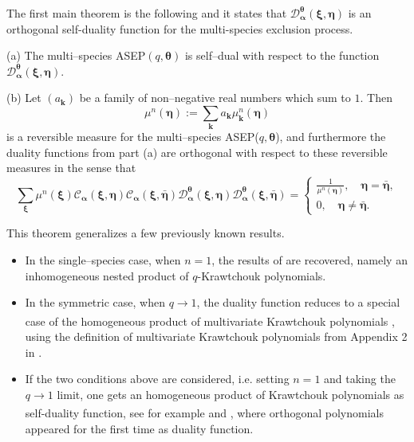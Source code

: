 \documentclass{ximera}
\begin{document}
The first main theorem is the following and it states that $\mathcal{D}_{\boldsymbol{\alpha}}^{\boldsymbol\theta} (\boldsymbol\xi,\boldsymbol\eta)$ is an orthogonal self-duality function for the multi-species exclusion process. 
\begin{theorem}\label{FirstThm}

(a) The multi--species ASEP$(q,\boldsymbol\theta)$ is self--dual with respect to the function $\mathcal{D}_{\boldsymbol{\alpha}}^{\boldsymbol\theta} (\boldsymbol\xi,\boldsymbol\eta)$. 

(b)  Let $(a_{\boldsymbol k})$ be a family of non--negative  real numbers which sum to $1$. Then
$$
\mu^n(\boldsymbol\eta):=\sum_{\boldsymbol k} a_{\boldsymbol k} \mu^n_{ \boldsymbol k}(\boldsymbol \eta)
$$
is a reversible measure for the multi--species ASEP($q,\boldsymbol\theta$), and furthermore the duality functions from part (a) are orthogonal  with respect to these reversible measures in the sense that
$$
\sum_{\boldsymbol\xi} \mu^{n}_{}(\boldsymbol\xi) \mathcal{C}_{\boldsymbol{\alpha}}(\boldsymbol\xi,\boldsymbol\eta)\mathcal{C}_{\boldsymbol{\alpha}}(\boldsymbol\xi,\bar{\boldsymbol\eta}) \mathcal{D}_{\boldsymbol{\alpha}}^{\boldsymbol\theta}(\boldsymbol\xi,\boldsymbol\eta)\mathcal{D}_{\boldsymbol{\alpha}}^{\boldsymbol\theta}(\boldsymbol\xi,\bar{\boldsymbol\eta}) = 
\begin{cases}
\frac{1}{\mu^{n}(\boldsymbol\eta)}, \quad \boldsymbol\eta = \bar{\boldsymbol\eta}, \\
0, \quad \boldsymbol\eta \neq \bar{\boldsymbol\eta}.
\end{cases}
$$

\end{theorem}

This theorem generalizes a few previously known results.
\begin{itemize}
\item
In the single--species case, when $n=1$, the results of \cite{CFG21} are recovered, namely an inhomogeneous nested product of $q$-Krawtchouk polynomials.

\item
In the symmetric case, when $q\xrightarrow[]{}1$, the duality function reduces to a special case of the homogeneous product of multivariate Krawtchouk polynomials \cite{ZZ}, using the definition of  multivariate Krawtchouk polynomials from Appendix 2 in \cite{Milch}.


\item
If the two conditions above are considered, i.e. setting $n=1$ and taking the $q\xrightarrow[]{}1$ limit, one gets an homogeneous product of Krawtchouk polynomials as self-duality function, see for example \cite{Gro19} and \cite{FG}, where orthogonal polynomials appeared for the first time as duality function.
\end{itemize}
       
\end{document}
